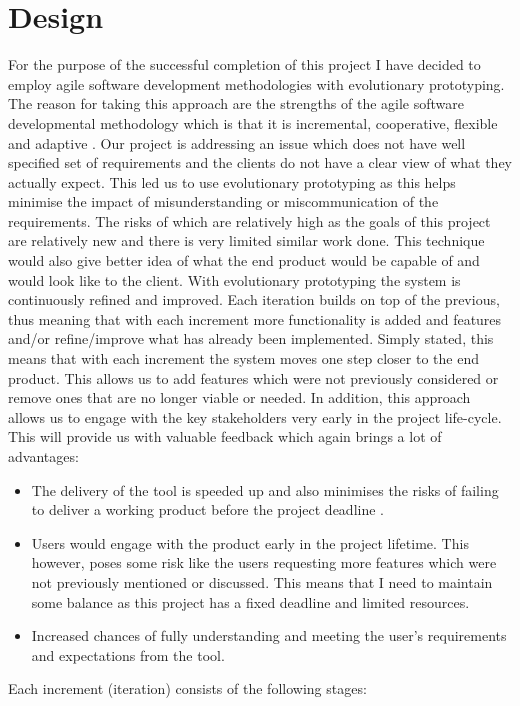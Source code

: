 \chapter{Design}
For the purpose of the successful completion of this project I have decided to employ agile software development methodologies with evolutionary prototyping. The reason for taking this approach are the strengths of the agile software developmental methodology which is that it is incremental, cooperative, flexible and adaptive \cite{4147390}. Our project is addressing an issue which does not have well specified set of requirements and the clients do not have a clear view of what they actually expect. This led us to use  evolutionary prototyping \cite{Connell89} as this helps minimise the impact of misunderstanding or miscommunication of the requirements. The risks of which are relatively high as the goals of this project are relatively new and there is very limited similar work done. This technique would also give better idea of what the end product would be capable of and would look like to the client. With evolutionary prototyping the system is continuously refined and improved. Each iteration builds on top of the previous, thus meaning that with each increment more functionality is added and features and/or refine/improve what has already been implemented. Simply stated, this means that with each increment the system moves one step closer to the end product. This allows us to add features which were not previously considered or remove ones that are no longer viable or needed. In addition, this approach allows us to engage with the key stakeholders very early in the project life-cycle. This will provide us with valuable feedback which again brings a lot of advantages:
\begin{itemize}
	\item The delivery of the tool is speeded up and also minimises the risks of failing to deliver a working product before the project deadline \cite{Connell89}.
	\item Users would engage with the product early in the project lifetime. This however, poses some risk like the users requesting more features which were not previously mentioned or discussed. This means that I need to maintain some balance as this project has a fixed deadline and limited resources.
	\item Increased chances of fully understanding and meeting the user's requirements and expectations from the tool.
\end{itemize}
Each increment (iteration) consists of the following stages:
